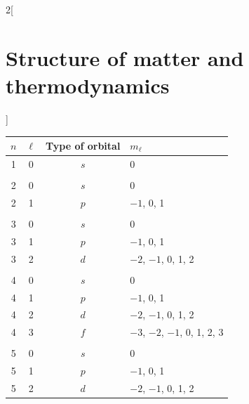 \documentclass[../../../main.tex]{subfiles}
\begin{document}
\begin{multicols}{2}[\section{Structure of matter and thermodynamics}]
\begin{definition}[Spin]
    \end{definition}
    \begin{center}
        \begin{minipage}{\linewidth}
            \centering
            \begin{tabular}{cccl}
                \hline
                \hline
                $n$ & $\ell$ & Type of orbital & $m_\ell$                              \\
                \hline
                1   & 0      & $s$             & 0                                     \\
                    &        &                 &                                       \\
                2   & 0      & $s$             & 0                                     \\
                2   & 1      & $p$             & $-1$, 0, 1                            \\
                    &        &                 &                                       \\
                3   & 0      & $s$             & 0                                     \\
                3   & 1      & $p$             & $-1$, 0, 1                            \\
                3   & 2      & $d$             & $-2$, $-1$, 0, 1, 2                   \\
                    &        &                 &                                       \\
                4   & 0      & $s$             & 0                                     \\
                4   & 1      & $p$             & $-1$, 0, 1                            \\
                4   & 2      & $d$             & $-2$, $-1$, 0, 1, 2                   \\
                4   & 3      & $f$             & $-3$, $-2$, $-1$, 0, 1, 2, 3          \\
                    &        &                 &                                       \\
                5   & 0      & $s$             & 0                                     \\
                5   & 1      & $p$             & $-1$, 0, 1                            \\
                5   & 2      & $d$             & $-2$, $-1$, 0, 1, 2                   \\

\end{tabular}
\end{minipage}
\end{center}
\end{multicols}
\end{document}

